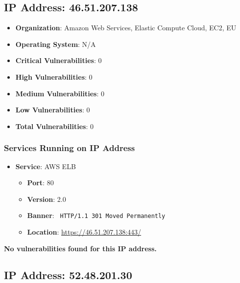 \documentclass{article}
\begin{document}
\subsection*{IP Address: 46.51.207.138}

\begin{itemize}
    \item \textbf{Organization}: Amazon Web Services, Elastic Compute Cloud, EC2, EU
    \item \textbf{Operating System}:  N/A 
    \item \textbf{Critical Vulnerabilities}: 0
    \item \textbf{High Vulnerabilities}: 0
    \item \textbf{Medium Vulnerabilities}: 0
    \item \textbf{Low Vulnerabilities}: 0
    \item \textbf{Total Vulnerabilities}: 0
\end{itemize}

\subsubsection*{Services Running on IP Address}

\begin{itemize}
    
        \item \textbf{Service}: AWS ELB
        \begin{itemize}
            \item \textbf{Port}: 80
            \item \textbf{Version}:  2.0 
            \item \textbf{Banner}: \texttt{
                HTTP/1.1 301 Moved Permanently
            }
            \item \textbf{Location}: \href{ https://46.51.207.138:443/ }{ https://46.51.207.138:443/ }
        \end{itemize}
    
\end{itemize}


\textbf{No vulnerabilities found for this IP address.}




\clearpage



\subsection*{IP Address: 52.48.201.30}
\end{document}
